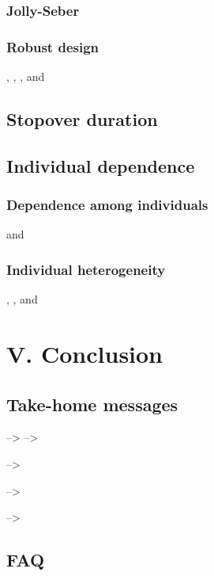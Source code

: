 \documentclass[
  12pt,
]{krantz}
\begin{document}
\citet{santostasi_use_2019}

\hypertarget{jolly-seber}{%
\section{Jolly-Seber}\label{jolly-seber}}

\hypertarget{robust-design}{%
\section{Robust design}\label{robust-design}}

\citet{karamanlidis_evidence_2015}, \citet{santostasi_robust_2016}, \citet{gibson_application_2018}, and \citet{rankin_full-capture_2016}

\hypertarget{stopover}{%
\chapter{Stopover duration}\label{stopover}}

\citet{guerin_advances_2017}

\hypertarget{individual-dependence}{%
\chapter{Individual dependence}\label{individual-dependence}}

\hypertarget{dependence-among-individuals}{%
\section{Dependence among individuals}\label{dependence-among-individuals}}

\citet{culina_multievent_2013} and \citet{cubaynes_modeling_2021}

\hypertarget{individual-heterogeneity}{%
\section{Individual heterogeneity}\label{individual-heterogeneity}}

\citet{cubaynes_importance_2010}, \citet{gimenez_individual_2010}, and \citet{turek_bayesian_2021}

\hypertarget{part-v.-conclusion}{%
\part{V. Conclusion}\label{part-v.-conclusion}}

\hypertarget{take-home-messages}{%
\chapter*{Take-home messages}\label{take-home-messages}}


--\textgreater{}
--\textgreater{}

--\textgreater{}

--\textgreater{}

--\textgreater{}

\hypertarget{faq}{%
\chapter*{FAQ}\label{faq}}


\backmatter

  

\printindex
\end{document}
